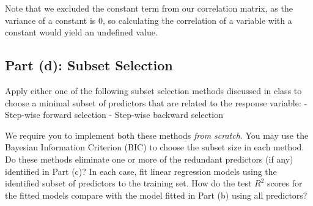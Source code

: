 \documentclass[11pt]{article}
\begin{document}
Note that we excluded the constant term from our correlation matrix, as
the variance of a constant is 0, so calculating the correlation of a
variable with a constant would yield an undefined value.

    \subsection{Part (d): Subset Selection}\label{part-d-subset-selection}

Apply either one of the following subset selection methods discussed in
class to choose a minimal subset of predictors that are related to the
response variable: - Step-wise forward selection - Step-wise backward
selection

We require you to implement both these methods \emph{from scratch}. You
may use the Bayesian Information Criterion (BIC) to choose the subset
size in each method. Do these methods eliminate one or more of the
redundant predictors (if any) identified in Part (c)? In each case, fit
linear regression models using the identified subset of predictors to
the training set. How do the test \(R^2\) scores for the fitted models
compare with the model fitted in Part (b) using all predictors?
\end{document}

